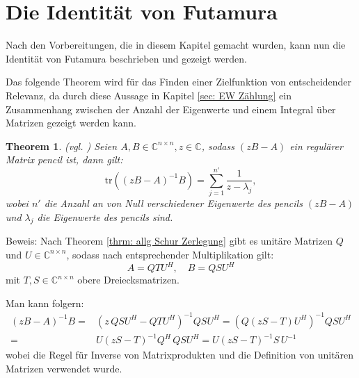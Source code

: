 \documentclass[a4paper,12pt]{report}
\newcommand{\C}{\mathbb C}
\newcommand{\tr}{\text{tr}}
\newcommand{\Cnn}{\C^{n\times n}}
\newcommand{\inv}{^{-1}}
\theoremstyle{plain} %
\newtheorem{theorem}{Theorem}
\theoremstyle{definition} %
\theoremstyle{remark}
\begin{document}
            

      
      \section{Die Identität von Futamura}
      \label{sec: Futamura}

            Nach den Vorbereitungen, die in diesem Kapitel gemacht wurden, kann nun die Identität von Futamura beschrieben und gezeigt werden.

            Das folgende Theorem wird für das Finden einer Zielfunktion von entscheidender Relevanz,
            da durch diese Aussage in Kapitel \ref{sec: EW Zählung} ein Zusammenhang zwischen der Anzahl der Eigenwerte und einem Integral über Matrizen gezeigt werden kann.

            \begin{theorem}
                  \label{thrm: IdentitätFutamura}(vgl. \cite[S. 127]{grundlageFutamura})
                  Seien $A, B\in\Cnn, z\in \C$, sodass $(zB-A)$ ein regulärer Matrix pencil ist, dann gilt:
                  \begin{equation}
                        \label{eqn: Resultat_Futamura}
                        \tr((zB-A)\inv B) = \sum_{j=1}^{n'} \frac{1}{z-\lambda_j},
                  \end{equation}
                  wobei $n'$ die Anzahl an von Null verschiedener Eigenwerte des pencils $(zB-A)$ und $\lambda_j$ die Eigenwerte des pencils sind.
            \end{theorem}
            Beweis:
            Nach Theorem \ref{thrm: allg Schur Zerlegung} gibt es unitäre Matrizen $Q$ und $U\in\Cnn$, sodass nach entsprechender Multiplikation gilt:
            $$A=QTU^H,\quad B=QSU^H$$
            mit $T,S\in\Cnn$ obere Dreiecksmatrizen.
            
            Man kann folgern:
            \begin{align*}
                  (zB-A)\inv B =& (z\,QSU^H-QTU^H)\inv QSU^H = (Q(zS-T)U^H)\inv QSU^H \\
                  =& U(zS-T)\inv Q^H\,QSU^H = U(zS-T)\inv S\,U\inv
            \end{align*}
            wobei die Regel für Inverse von Matrixprodukten und die Definition von unitären Matrizen verwendet wurde.
\end{document}
